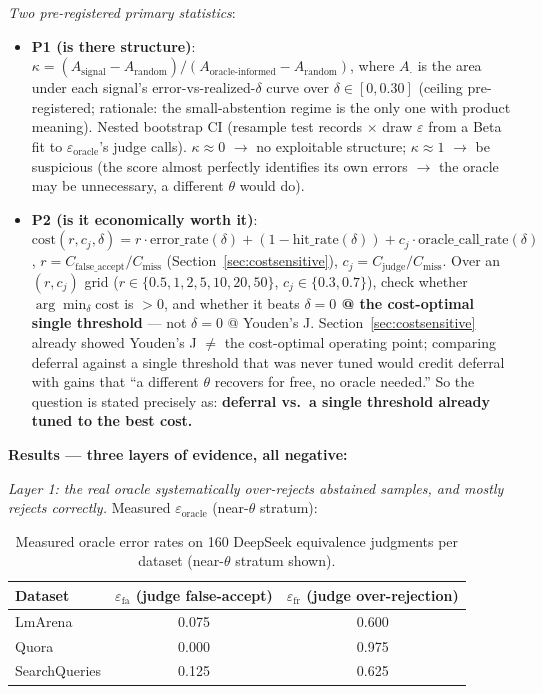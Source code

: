 \documentclass[11pt]{article}
\newenvironment{fittab}{\begin{lrbox}{\fittabbox}}{\end{lrbox}%
  \ifdim\wd\fittabbox>\linewidth\resizebox{\linewidth}{!}{\usebox{\fittabbox}}\else\usebox{\fittabbox}\fi}
\begin{document}
\emph{Two pre-registered primary statistics}:

\begin{itemize}[leftmargin=*]
  \item \textbf{P1 (is there structure)}: $\kappa = (A_\text{signal} - A_\text{random}) / (A_\text{oracle-informed} - A_\text{random})$, where $A_\cdot$ is the area under each signal's error-vs-realized-$\delta$ curve over $\delta \in [0, 0.30]$ (ceiling pre-registered; rationale: the small-abstention regime is the only one with product meaning). Nested bootstrap CI (resample test records $\times$ draw $\varepsilon$ from a Beta fit to $\varepsilon_\text{oracle}$'s judge calls). $\kappa \approx 0$ $\to$ no exploitable structure; $\kappa \approx 1$ $\to$ be suspicious (the score almost perfectly identifies its own errors $\to$ the oracle may be unnecessary, a different $\theta$ would do).
  \item \textbf{P2 (is it economically worth it)}: $\mathrm{cost}(r, c_j, \delta) = r \cdot \mathrm{error\_rate}(\delta) + (1 - \mathrm{hit\_rate}(\delta)) + c_j \cdot \mathrm{oracle\_call\_rate}(\delta)$, $r = C_\text{false\_accept} / C_\text{miss}$ (Section~\ref{sec:costsensitive}), $c_j = C_\text{judge} / C_\text{miss}$. Over an $(r, c_j)$ grid ($r \in \{0.5, 1, 2, 5, 10, 20, 50\}$, $c_j \in \{0.3, 0.7\}$), check whether $\arg\min_\delta \mathrm{cost}$ is $> 0$, and whether it beats \textbf{$\delta{=}0$ @ the cost-optimal single threshold} --- not $\delta{=}0$ @ Youden's J. Section~\ref{sec:costsensitive} already showed Youden's J $\ne$ the cost-optimal operating point; comparing deferral against a single threshold that was never tuned would credit deferral with gains that ``a different $\theta$ recovers for free, no oracle needed.'' So the question is stated precisely as: \textbf{deferral vs.\ a single threshold already tuned to the best cost.}
\end{itemize}

\textbf{Results --- three layers of evidence, all negative:}

\emph{Layer 1: the real oracle systematically over-rejects abstained samples, and mostly rejects correctly.} Measured $\varepsilon_\text{oracle}$ (near-$\theta$ stratum):

\begin{table}[h]
\centering
\small
\begin{fittab}\begin{tabular}{@{}lcc@{}}
\toprule
\textbf{Dataset} & \textbf{$\varepsilon_\text{fa}$ (judge false-accept)} & \textbf{$\varepsilon_\text{fr}$ (judge over-rejection)} \\
\midrule
LmArena & 0.075 & 0.600 \\
Quora & 0.000 & 0.975 \\
SearchQueries & 0.125 & 0.625 \\
\bottomrule
\end{tabular}\end{fittab}
\caption{Measured oracle error rates on 160 DeepSeek equivalence judgments per dataset (near-$\theta$ stratum shown).}
\end{table}
\end{document}
